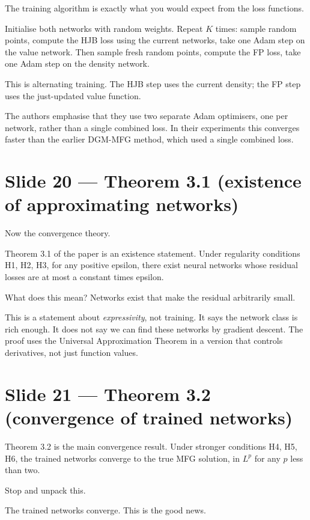 \documentclass[11pt]{article}
\begin{document}
The training algorithm is exactly what you would expect from the loss
functions.

Initialise both networks with random weights.  Repeat $K$ times: sample
random points, compute the HJB loss using the current networks, take
one Adam step on the value network.  Then sample fresh random points,
compute the FP loss, take one Adam step on the density network.

This is alternating training.  The HJB step uses the current density;
the FP step uses the just-updated value function.

The authors emphasise that they use two separate Adam optimisers, one
per network, rather than a single combined loss.  In their experiments
this converges faster than the earlier DGM-MFG method, which used a
single combined loss.

\section*{Slide 20 --- Theorem 3.1 (existence of approximating networks)}

Now the convergence theory.

Theorem 3.1 of the paper is an existence statement.  Under regularity
conditions H1, H2, H3, for any positive epsilon, there exist neural
networks whose residual losses are at most a constant times epsilon.

What does this mean?  Networks exist that make the residual arbitrarily
small.

This is a statement about \emph{expressivity}, not training.  It says
the network class is rich enough.  It does not say we can find these
networks by gradient descent.  The proof uses the Universal
Approximation Theorem in a version that controls derivatives, not just
function values.

\section*{Slide 21 --- Theorem 3.2 (convergence of trained networks)}

Theorem 3.2 is the main convergence result.  Under stronger conditions
H4, H5, H6, the trained networks converge to the true MFG solution, in
$L^p$ for any $p$ less than two.

Stop and unpack this.

The trained networks converge.  This is the good news.
\end{document}
